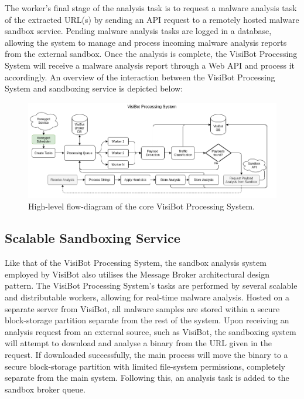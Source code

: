 The worker's final stage of the analysis task is to request a malware analysis task of the extracted URL(s) by sending an API request to a remotely hosted malware sandbox service. Pending malware analysis tasks are logged in a database, allowing the system to manage and process incoming malware analysis reports from the external sandbox. Once the analysis is complete, the VisiBot Processing System will receive a malware analysis report through a Web API and process it accordingly. An overview of the interaction between the VisiBot Processing System and sandboxing service is depicted below:

\begin{figure}[!htb]
    \centering
    \includegraphics[width=0.9\linewidth]{flowcharts/high_level_processing_overview.png}
    \caption{High-level flow-diagram of the core VisiBot Processing System.}
    \label{fig:high_level_proc_overview} 
\end{figure}

\subsection{Scalable Sandboxing Service}

Like that of the VisiBot Processing System, the sandbox analysis system employed by VisiBot also utilises the Message Broker architectural design pattern. The VisiBot Processing System's tasks are performed by several scalable and distributable workers, allowing for real-time malware analysis. Hosted on a separate server from VisiBot, all malware samples are stored within a secure block-storage partition separate from the rest of the system. Upon receiving an analysis request from an external source, such as VisiBot, the sandboxing system will attempt to download and analyse a binary from the URL given in the request. If downloaded successfully, the main process will move the binary to a secure block-storage partition with limited file-system permissions, completely separate from the main system. Following this, an analysis task is added to the sandbox broker queue.

